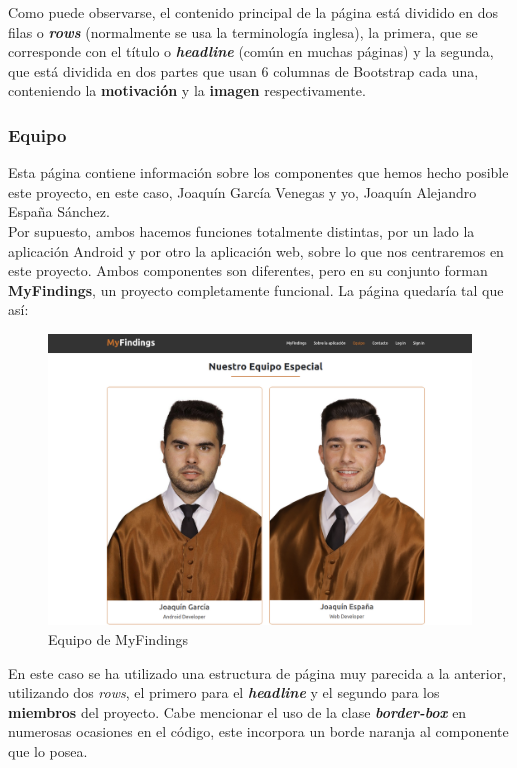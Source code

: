     Como puede observarse, el contenido principal de la página está dividido en dos filas
    o \textbf{\textit{rows}} (normalmente se usa la terminología inglesa), la primera, que
    se corresponde con el título o \textbf{\textit{headline}} (común en muchas páginas) y la
    segunda, que está dividida en dos partes que usan 6 columnas de Bootstrap cada una,
    conteniendo la \textbf{motivación} y la \textbf{imagen} respectivamente.

    \subsubsection{Equipo}
    Esta página contiene información sobre los componentes que hemos hecho posible este
    proyecto, en este caso, Joaquín García Venegas y yo, Joaquín Alejandro España Sánchez.\\
    
    Por supuesto, ambos hacemos funciones totalmente distintas, por un lado la aplicación
    Android y por otro la aplicación web, sobre lo que nos centraremos en este proyecto.
    Ambos componentes son diferentes, pero en su conjunto forman \textbf{MyFindings},
    un proyecto completamente funcional. La página quedaría tal que así:

        \begin{figure}[H]
            \centering
            \includegraphics[scale=0.25]{imagenes/team.png}
            \caption{Equipo de MyFindings}
            \label{fig:team}
        \end{figure}

    En este caso se ha utilizado una estructura de página muy parecida a la anterior, utilizando
    dos \textit{rows}, el primero para el \textbf{\textit{headline}} y el segundo para los
    \textbf{miembros} del proyecto. Cabe mencionar el uso de la clase \textbf{\textit{border-box}}
    en numerosas ocasiones en el código, este incorpora un borde naranja al componente que lo posea.

